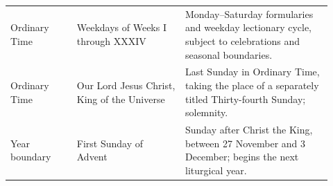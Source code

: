 \begin{longtable}{>{\raggedright\arraybackslash}p{0.19\linewidth}>{\raggedright\arraybackslash}p{0.31\linewidth}>{\raggedright\arraybackslash}p{0.42\linewidth}}
Ordinary Time & Weekdays of Weeks I through XXXIV & Monday--Saturday formularies and weekday lectionary cycle, subject to celebrations and seasonal boundaries.\\
Ordinary Time & Our Lord Jesus Christ, King of the Universe & Last Sunday in Ordinary Time, taking the place of a separately titled Thirty-fourth Sunday; solemnity.\\
Year boundary & First Sunday of Advent & Sunday after Christ the King, between 27 November and 3 December; begins the next liturgical year.\\
\bottomrule
\end{longtable}
